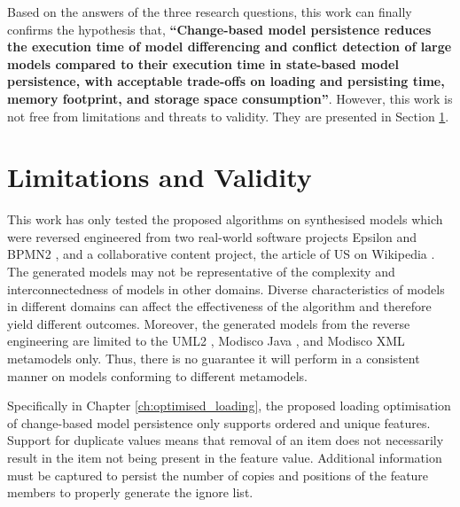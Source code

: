 Based on the answers of the three research questions, this work can finally confirms the hypothesis that, 
\textbf{``Change-based model persistence reduces the execution time of model differencing and conflict detection of large models compared to their execution time in state-based model persistence, with acceptable trade-offs on loading and persisting time, memory footprint, and storage space consumption''}. However, this work is not free from limitations and threats to validity. They are presented in Section \ref{sec:limitation_and_Threat_to_validity}.

\section{Limitations and Validity}
\label{sec:limitation_and_Threat_to_validity}
This work has only tested the proposed algorithms on synthesised models which were reversed engineered from two real-world software projects Epsilon \cite{eclipse2018epsilongit} and BPMN2 \cite{eclipse2018bpmn2git}, and a collaborative content project, the article of US on Wikipedia \cite{wikipedia2018us}. The generated models may not be representative of the complexity and interconnectedness of models in other domains. Diverse characteristics of models in different domains can affect the effectiveness of the algorithm and therefore yield different outcomes. Moreover, the generated models from the reverse engineering are limited to the UML2 \cite{eclipse2017uml2}, Modisco Java \cite{eclipse2018modiscojava}, and Modisco XML \cite{eclipse2018modiscoxml} metamodels only. Thus, there is no guarantee it will perform in a consistent manner on models conforming to different metamodels.

Specifically in Chapter \ref{ch:optimised_loading}, the proposed loading optimisation of change-based model persistence only supports ordered and unique features. Support for duplicate values means that removal of an item does not necessarily result in the item not being present in the feature value. Additional information must be captured to persist the number of copies and positions of the feature members to properly generate the ignore list. 

